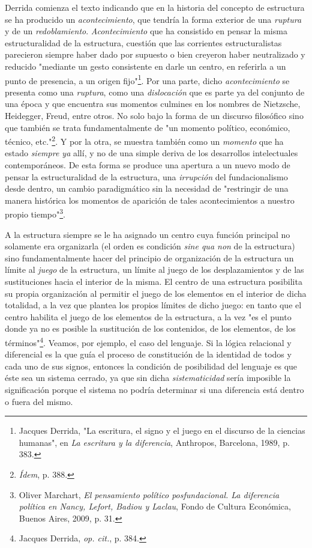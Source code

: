 \documentclass{book}
\begin{document}
Derrida comienza el texto indicando que en la historia del concepto de
estructura se ha producido un \emph{acontecimiento}, que tendría la
forma exterior de una \emph{ruptura} y de un \emph{redoblamiento}.
\emph{Acontecimiento} que ha consistido en pensar la misma
estructuralidad de la estructura, cuestión que las corrientes
estructuralistas parecieron siempre haber dado por supuesto o bien
creyeron haber neutralizado y reducido "mediante un gesto consistente en
darle un centro, en referirla a un punto de presencia, a un origen
fijo"\footnote{Jacques Derrida, "La escritura, el signo y el juego en el
  discurso de la ciencias humanas", en \emph{La escritura y la
  diferencia}, Anthropos, Barcelona, 1989, p. 383.}. Por una parte,
dicho \emph{acontecimiento} se presenta como una \emph{ruptura}, como
una \emph{dislocación} que es parte ya del conjunto de una época y que
encuentra sus momentos culmines en los nombres de Nietzsche, Heidegger,
Freud, entre otros. No solo bajo la forma de un discurso filosófico sino
que también se trata fundamentalmente de "un momento político,
económico, técnico, etc."\footnote{\emph{Ídem}, p. 388.}. Y por la otra,
se muestra también como un \emph{momento} que ha estado \emph{siempre
ya} allí, y no de una simple deriva de los desarrollos intelectuales
contemporáneos. De esta forma se produce una apertura a un nuevo modo de
pensar la estructuralidad de la estructura, una \emph{irrupción} del
fundacionalismo desde dentro, un cambio paradigmático sin la necesidad
de "restringir de una manera histórica los momentos de aparición de
tales acontecimientos a nuestro propio tiempo"\footnote{Oliver Marchart,
  \emph{El pensamiento político posfundacional. La diferencia política
  en Nancy, Lefort, Badiou y Laclau}, Fondo de Cultura Económica, Buenos
  Aires, 2009, p. 31.}.

A la estructura siempre se le ha asignado un centro cuya función
principal no solamente era organizarla (el orden es condición \emph{sine
qua non} de la estructura) sino fundamentalmente hacer del principio de
organización de la estructura un límite al \emph{juego} de la
estructura, un límite al juego de los desplazamientos y de las
sustituciones hacia el interior de la misma. El centro de una estructura
posibilita su propia organización al permitir el juego de los elementos
en el interior de dicha totalidad, a la vez que plantea los propios
límites de dicho juego: en tanto que el centro habilita el juego de los
elementos de la estructura, a la vez "es el punto donde ya no es posible
la sustitución de los contenidos, de los elementos, de los
términos"\footnote{Jacques Derrida, \emph{op. cit.}, p. 384.}. Veamos,
por ejemplo, el caso del lenguaje. Si la lógica relacional y diferencial
es la que guía el proceso de constitución de la identidad de todos y
cada uno de sus signos, entonces la condición de posibilidad del
lenguaje es que éste sea un sistema cerrado, ya que sin dicha
\emph{sistematicidad} sería imposible la significación porque el sistema
no podría determinar si una diferencia está dentro o fuera del mismo.
\end{document}
